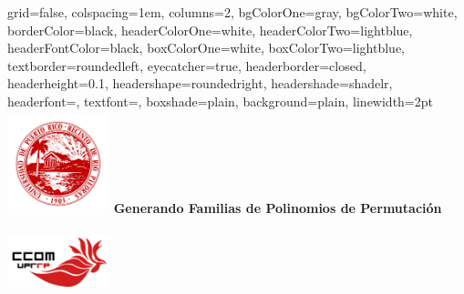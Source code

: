 \documentclass[landscape,final,paperwidth=24in,paperheight=36in]{baposter}
\begin{document}
\begin{poster}%
  {
  grid=false,
  colspacing=1em,
  columns=2,
  bgColorOne=gray,
  bgColorTwo=white,
  borderColor=black,
  headerColorOne=white,
  headerColorTwo=lightblue,
  headerFontColor=black,
  boxColorOne=white,
  boxColorTwo=lightblue,
  textborder=roundedleft,
  eyecatcher=true,
  headerborder=closed,
  headerheight=0.1\textheight,
  headershape=roundedright,
  headershade=shadelr,
  headerfont=\textsc, %
  textfont=\scriptsize{\setlength{\parindent}{1.5em}},
  boxshade=plain,
  background=plain,
  linewidth=2pt
  }
  {\includegraphics[height=8em,width=8em,keepaspectratio=true]{images/logo_uprrp}} 
  {\bf {\LARGE Generando Familias de Polinomios de Permutaci\'on}}
  {}
  {%
    \includegraphics[height=7em,width=8em,keepaspectratio=true]{gallo}
  }

    \newcommand{\colouredcircle}{%
      \tikz{\useasboundingbox (-0.2em,-0.32em) rectangle(0.2em,0.32em); \draw[draw=black,fill=lightblue,line width=0.03em] (0,0) circle(0.18em);}}



\end{poster}
\end{document}
